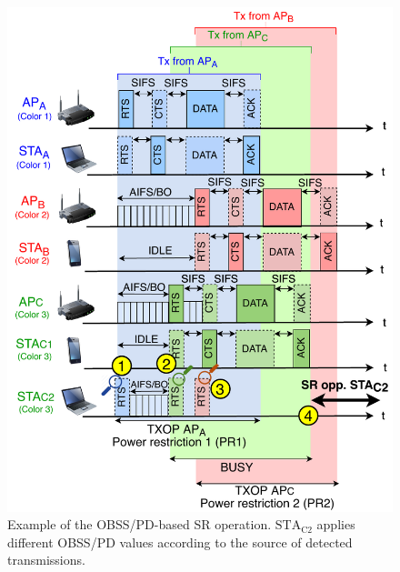 \documentclass{ieeeaccess}
\begin{document}
\begin{figure}[ht!]
	\centering
	\includegraphics[width=\columnwidth]{fig_12}
	\caption{Example of the OBSS/PD-based SR operation. $\text{STA}_\text{C2}$ applies different OBSS/PD values according to the source of detected transmissions.}
	\label{fig:fig_12}
\end{figure}

\end{document}
